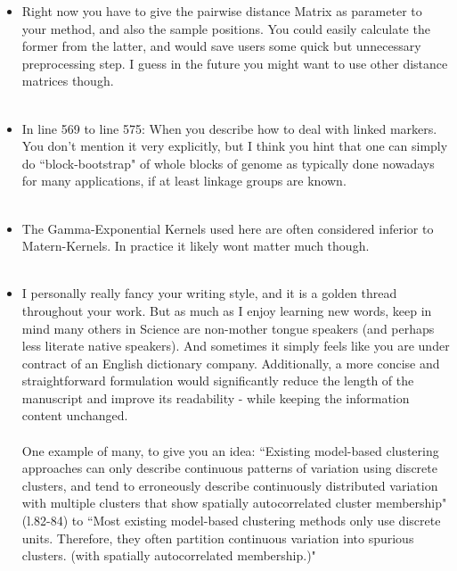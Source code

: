 \documentclass[11pt]{letter}
\newcommand{\gb}[1]{{\bf\color{black}{#1}}}
\begin{document}
\begin{itemize}
 \item Right now you have to give the pairwise distance Matrix as parameter to your method, 
 and also the sample positions. 
 You could easily calculate the former from the latter, 
 and would save users some quick but unnecessary preprocessing step. 
 I guess in the future you might want to use other distance matrices though.\\\\
\gb{Right, it would save users some time for us to calculate pairwise distances for them,
but at the expense of flexibility.
Some users may want to use other distance matrices 
(e.g., distance within a river system, or along a coastline, or around the Tibetan plateau, etc.), 
so we leave it up to them to specify one.}
 
 \item In line 569 to line 575: When you describe how to deal with linked markers. 
 You don't mention it very explicitly, 
 but I think you hint that one can simply do ``block-bootstrap" of whole blocks of genome 
 as typically done nowadays for many applications, 
 if at least linkage groups are known.\\\\
\gb{Yes, we think that's likely the best way to do it when linkage is known.
We've added some text about that in the ``Cross-validation" section of the Appendix 
(Lines XXX-XXX).}
 
 \item The Gamma-Exponential Kernels used here are often considered inferior to Matern-Kernels. 
 In practice it likely wont matter much though.\\\\
\gb{Yes, one of the next updates we plan is to replace the flexible but 
poorly motivated powered exponential with the form worked out for 
probability of identity by state in continuous space from Barton, Depaulis, and Etheridge (2000).}

\item I personally really fancy your writing style, 
and it is a golden thread throughout your work.  
But as much as I enjoy learning new words, 
keep in mind many others in Science are non-mother tongue speakers 
(and perhaps less literate native speakers). 
And sometimes it simply feels like you are under contract of an English dictionary company.
Additionally, a more concise and straightforward formulation 
would significantly reduce the length of the manuscript and improve its readability 
- while keeping the information content unchanged. 
\\\\
One example of many, to give you an idea:
``Existing model-based clustering approaches can only describe 
continuous patterns of variation using discrete clusters,
 and tend to erroneously describe continuously distributed variation 
 with multiple clusters that show spatially autocorrelated cluster membership" (l.82-84)
to 
``Most existing model-based clustering methods only use discrete units. 
Therefore, they often partition continuous variation into spurious clusters. 
(with spatially autocorrelated membership.)"


\end{itemize}
\end{document}
